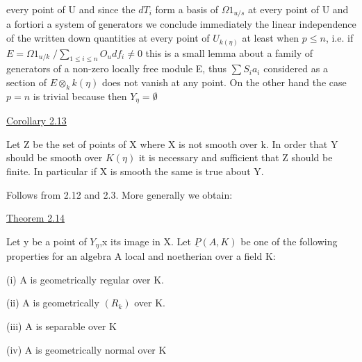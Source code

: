 
every point of U and since the $dT_i$ form a basis of $\Omega 1_{u/s}$ at every
point of U and a fortiori a system of generators we conclude
immediately the linear independence of the written down quantities
at every point of $U_{k(\eta)}$ at least when $p \leq n$, i.e.
if $E = \Omega 1_{u/k} \;/ \sum\limits_{1 \leq i \leq n} O_u df_i \neq 0$ this is a small lemma about a family of
generators of a non-zero locally free module E, thus $\sum S_i a_i$
considered as a section of $E \otimes_k k(\eta)$ does not vanish at any point.
On the other hand the case $p = n$ is trivial because then $Y_\eta = \emptyset$
\par{}

\uline{Corollary 2.13}

Let Z be the set of points of X where X is not smooth over k.
In order that Y should be smooth over $K(\eta)$ it is necessary and
sufficient that Z should be finite. In particular if X is smooth
the same is true about Y.

Follows from 2.12 and 2.3. More generally we obtain:

\uline{Theorem 2.14}

Let y be a point of $Y_\eta$,x its image in X. Let $\underline{P}(A,K)$ be one of
the following properties for an algebra A local and noetherian
over a field K:

(i) A is geometrically regular over K.

(ii) A is geometrically $(R_k)$ over K.

(iii) A is separable over K

(iv) A is geometrically normal over K
